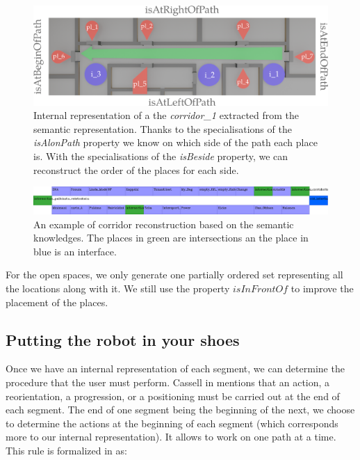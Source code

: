 \begin{figure}[ht!]
\centering
\includegraphics[width=\textwidth]{figures/chapter3/corridor.png}
\caption{\label{fig:chap3_corridor} Internal representation of a the \textit{corridor\_1} extracted from the semantic representation. Thanks to the specialisations of the \textit{isAlonPath} property we know on which side of the path each place is. With the specialisations of the \textit{isBeside} property, we can reconstruct the order of the places for each side. }
\end{figure}

\begin{figure}[ht!]
\centering
\includegraphics[width=\textwidth]{figures/chapter3/pallokatu.png}
\caption{\label{fig:chap3_pallokatu} An example of corridor reconstruction based on the semantic knowledges. The places in green are intersections an the place in blue is an interface. }
\end{figure}

For the open spaces, we only generate one partially ordered set representing all the locations along with it. We still use the property $isInFrontOf$ to improve the placement of the places.

\subsection{Putting the robot in your shoes}

Once we have an internal representation of each segment, we can determine the procedure that the user must perform. Cassell in \cite{cassell_2007_trading} mentions that an action, a reorientation, a progression, or a positioning must be carried out at the end of each segment. The end of one segment being the beginning of the next, we choose to determine the actions at the beginning of each segment (which corresponds more to our internal representation). It allows to work on one path at a time. This rule is formalized in \cite{mallot_2009_embodied} as:

